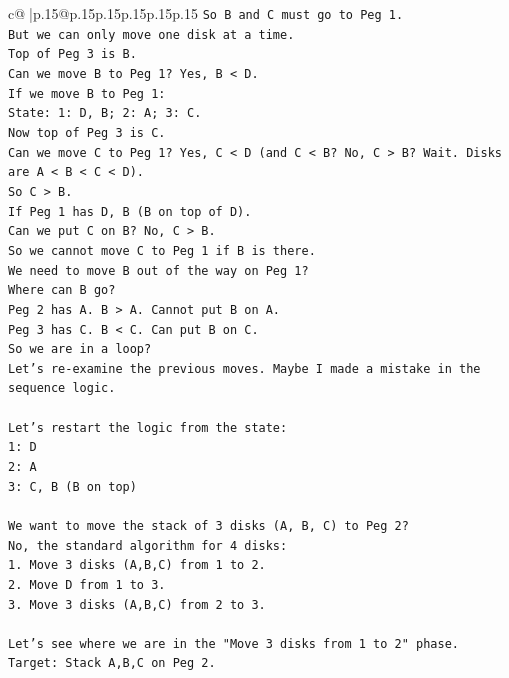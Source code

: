 \documentclass{article}
\begin{document}
{\begin{supertabular}{c@{$\;$}|p{.15\linewidth}@{}p{.15\linewidth}p{.15\linewidth}p{.15\linewidth}p{.15\linewidth}p{.15\linewidth}}
{{{\texttt{So B and C must go to Peg 1.} \\
\texttt{But we can only move one disk at a time.} \\
\texttt{Top of Peg 3 is B.} \\
\texttt{Can we move B to Peg 1? Yes, B < D.} \\
\texttt{If we move B to Peg 1:} \\
\texttt{State: 1: D, B; 2: A; 3: C.} \\
\texttt{Now top of Peg 3 is C.} \\
\texttt{Can we move C to Peg 1? Yes, C < D (and C < B? No, C > B? Wait. Disks are A < B < C < D).} \\
\texttt{So C > B.} \\
\texttt{If Peg 1 has D, B (B on top of D).} \\
\texttt{Can we put C on B? No, C > B.} \\
\texttt{So we cannot move C to Peg 1 if B is there.} \\
\texttt{We need to move B out of the way on Peg 1?} \\
\texttt{Where can B go?} \\
\texttt{Peg 2 has A. B > A. Cannot put B on A.} \\
\texttt{Peg 3 has C. B < C. Can put B on C.} \\
\texttt{So we are in a loop?} \\
\texttt{Let's re{-}examine the previous moves. Maybe I made a mistake in the sequence logic.} \\
\\ 
\texttt{Let's restart the logic from the state:} \\
\texttt{1: D} \\
\texttt{2: A} \\
\texttt{3: C, B (B on top)} \\
\\ 
\texttt{We want to move the stack of 3 disks (A, B, C) to Peg 2?} \\
\texttt{No, the standard algorithm for 4 disks:} \\
\texttt{1. Move 3 disks (A,B,C) from 1 to 2.} \\
\texttt{2. Move D from 1 to 3.} \\
\texttt{3. Move 3 disks (A,B,C) from 2 to 3.} \\
\\ 
\texttt{Let's see where we are in the "Move 3 disks from 1 to 2" phase.} \\
\texttt{Target: Stack A,B,C on Peg 2.} \\
}}}
\end{supertabular}}
\end{document}

